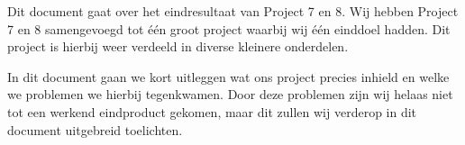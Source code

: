Dit document gaat over het eindresultaat van Project 7 en 8. Wij hebben Project 7 en 8 samengevoegd tot \'{e}\'{e}n groot project waarbij wij \'{e}\'{e}n einddoel hadden. Dit project is hierbij weer verdeeld in diverse kleinere onderdelen. 

In dit document gaan we kort uitleggen wat ons project precies inhield en welke we problemen we hierbij tegenkwamen. Door deze problemen zijn wij helaas niet tot een werkend eindproduct gekomen, maar dit zullen wij verderop in dit document uitgebreid toelichten.
